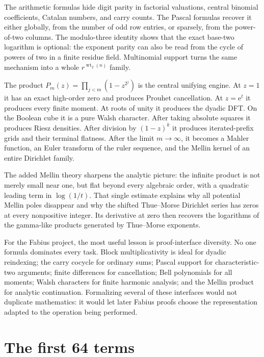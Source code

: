 \documentclass[11pt,oneside]{article}
\numberwithin{equation}{section}
\theoremstyle{definition}
\theoremstyle{remark}
\newcommand{\e}{\mathrm e}
\newcommand{\wt}{\operatorname{wt}_2}
\begin{document}
The arithmetic formulas hide digit parity in factorial valuations, central
binomial coefficients, Catalan numbers, and carry counts.  The Pascal formulas
recover it either globally, from the number of odd row entries, or sparsely,
from the power-of-two columns.  The modulo-three identity shows that the exact
base-two logarithm is optional: the exponent parity can also be read from the
cycle of powers of two in a finite residue field.  Multinomial support turns the
same mechanism into a whole \(r^{\wt(n)}\) family.

The product
\(P_m(z)=\prod_{j<m}(1-z^{2^j})\) is the central unifying engine.  At
\(z=1\) it has an exact high-order zero and produces Prouhet cancellation.  At
\(z=\e^t\) it produces every finite moment.  At roots of unity it produces the
dyadic DFT.  On the Boolean cube it is a pure Walsh character.  After taking
absolute squares it produces Riesz densities.  After division by
\((1-z)^k\) it produces iterated-prefix grids and their terminal flatness.
After the limit \(m\to\infty\), it becomes a Mahler function, an Euler
transform of the ruler sequence, and the Mellin kernel of an entire Dirichlet
family.

The added Mellin theory sharpens the analytic picture: the infinite product is
not merely small near one, but flat beyond every algebraic order, with a
quadratic leading term in \(\log(1/t)\).  That single estimate explains why
all potential Mellin poles disappear and why the shifted Thue--Morse Dirichlet
series has zeros at every nonpositive integer.  Its derivative at zero then
recovers the logarithms of the gamma-like products generated by Thue--Morse
exponents.

For the Fabius project, the most useful lesson is proof-interface diversity.
No one formula dominates every task.  Block multiplicativity is ideal for
dyadic reindexing; the carry cocycle for ordinary sums; Pascal support for
characteristic-two arguments; finite differences for cancellation; Bell
polynomials for all moments; Walsh characters for finite harmonic analysis;
and the Mellin product for analytic continuation.  Formalizing several of
these interfaces would not duplicate mathematics: it would let later Fabius
proofs choose the representation adapted to the operation being performed.

\appendix

\section[First 64 terms]{The first 64 terms}
\label{p1:app:first-terms}
\end{document}
